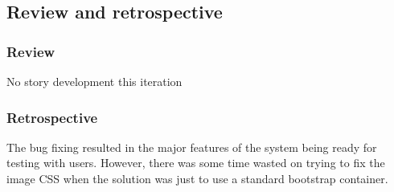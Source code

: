 \subsection{Review and retrospective}
\subsubsection{Review}
No story development this iteration

\subsubsection{Retrospective}
The bug fixing resulted in the major features of the system being ready for testing with users. However, there was some time wasted on trying to fix the image CSS when the solution was just to use a standard bootstrap container.
\newpage
